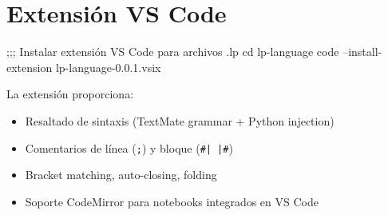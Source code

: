 \section{Extensión VS Code}

\begin{lispcode}
;;; Instalar extensión VS Code para archivos .lp
cd lp-language
code --install-extension lp-language-0.0.1.vsix
\end{lispcode}

La extensión proporciona:
\begin{itemize}
\item Resaltado de sintaxis (TextMate grammar + Python injection)
\item Comentarios de línea (\texttt{;}) y bloque (\texttt{\#| |\#})
\item Bracket matching, auto-closing, folding
\item Soporte CodeMirror para notebooks integrados en VS Code
\end{itemize}
